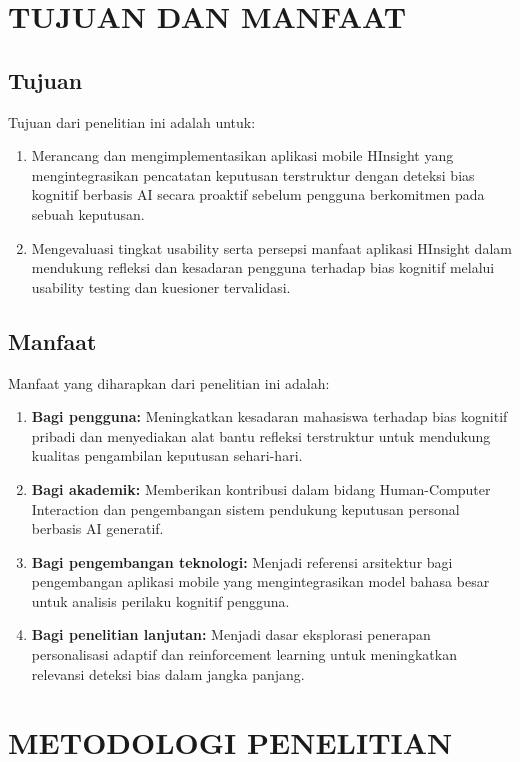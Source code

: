 \documentclass[11pt]{article}
\begin{document}
\section{TUJUAN DAN MANFAAT}
 
\subsection{Tujuan}
Tujuan dari penelitian ini adalah untuk:
\begin{enumerate}
  \item Merancang dan mengimplementasikan aplikasi mobile HInsight yang mengintegrasikan pencatatan keputusan terstruktur dengan deteksi bias kognitif berbasis AI secara proaktif sebelum pengguna berkomitmen pada sebuah keputusan.
  \item Mengevaluasi tingkat usability serta persepsi manfaat aplikasi HInsight dalam mendukung refleksi dan kesadaran pengguna terhadap bias kognitif melalui usability testing dan kuesioner tervalidasi.
\end{enumerate}
 
\subsection{Manfaat}
Manfaat yang diharapkan dari penelitian ini adalah:
\begin{enumerate}
  \item \textbf{Bagi pengguna:} Meningkatkan kesadaran mahasiswa terhadap bias kognitif pribadi dan menyediakan alat bantu refleksi terstruktur untuk mendukung kualitas pengambilan keputusan sehari-hari.
  \item \textbf{Bagi akademik:} Memberikan kontribusi dalam bidang Human-Computer Interaction dan pengembangan sistem pendukung keputusan personal berbasis AI generatif.
  \item \textbf{Bagi pengembangan teknologi:} Menjadi referensi arsitektur bagi pengembangan aplikasi mobile yang mengintegrasikan model bahasa besar untuk analisis perilaku kognitif pengguna.
  \item \textbf{Bagi penelitian lanjutan:} Menjadi dasar eksplorasi penerapan personalisasi adaptif dan reinforcement learning untuk meningkatkan relevansi deteksi bias dalam jangka panjang.
\end{enumerate}
 
\section{METODOLOGI PENELITIAN}
 
\end{document}
